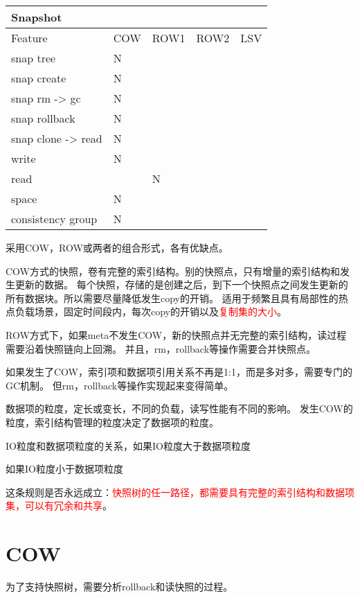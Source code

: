 \begin{tabular}{|s|p{0.6cm}|p{0.6cm}|p{0.6cm}|p{0.6cm}| }
    \hline
      {Snapshot} \\
    \hline
    Feature & COW & ROW1 & ROW2 & LSV \\
    \hline
    snap tree & N &  & & \\
    \hline
    snap create & N &  & & \\
    \hline
    snap rm -> gc & N &  & & \\
    \hline
    snap rollback & N &  & & \\
    \hline
    snap clone -> read & N & & & \\
    \hline
    write & N &  & & \\
    \hline
    read & & N & & \\
    \hline
    space & N &  & & \\
    \hline
    consistency group & N &  & & \\
    \hline
\end{tabular}

采用COW，ROW或两者的组合形式，各有优缺点。

COW方式的快照，卷有完整的索引结构。别的快照点，只有增量的索引结构和发生更新的数据。
每个快照，存储的是创建之后，到下一个快照点之间发生更新的所有数据块。所以需要尽量降低发生copy的开销。
适用于频繁且具有局部性的热点负载场景，固定时间段内，每次copy的开销以及\textcolor{red}{复制集的大小}。

ROW方式下，如果meta不发生COW，新的快照点并无完整的索引结构，读过程需要沿着快照链向上回溯。
并且，rm，rollback等操作需要合并快照点。

如果发生了COW，索引项和数据项引用关系不再是1:1，而是多对多，需要专门的GC机制。
但rm，rollback等操作实现起来变得简单。

数据项的粒度，定长或变长，不同的负载，读写性能有不同的影响。
发生COW的粒度，索引结构管理的粒度决定了数据项的粒度。

IO粒度和数据项粒度的关系，如果IO粒度大于数据项粒度

如果IO粒度小于数据项粒度

这条规则是否永远成立：\textcolor{red}{快照树的任一路径，都需要具有完整的索引结构和数据项集，可以有冗余和共享}。

\section{COW}

为了支持快照树，需要分析rollback和读快照的过程。

